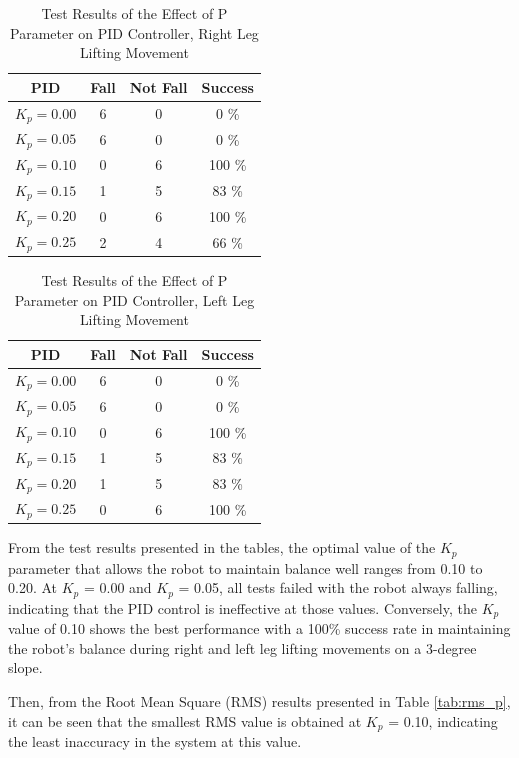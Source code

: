 \begin{enumerate}[label=\Alph*.]
        \begin{table}[h]
            \centering
            \caption{Test Results of the Effect of P Parameter on PID Controller, Right Leg Lifting Movement}
            \begin{tabular}{|c|c|c|c|}
                \hline
                \textbf{PID} & \textbf{Fall} & \textbf{Not Fall} & \textbf{Success} \\
                \hline
                $K_p = 0.00$ & 6 & 0 & 0   \% \\
                $K_p = 0.05$ & 6 & 0 & 0   \% \\
                $K_p = 0.10$ & 0 & 6 & 100 \% \\
                $K_p = 0.15$ & 1 & 5 & 83  \% \\
                $K_p = 0.20$ & 0 & 6 & 100 \% \\
                $K_p = 0.25$ & 2 & 4 & 66  \% \\            
                \hline
            \end{tabular}
            \label{tab:testing_p_right}
        \end{table}

        \begin{table}[h]
            \centering
            \caption{Test Results of the Effect of P Parameter on PID Controller, Left Leg Lifting Movement}
            \begin{tabular}{|c|c|c|c|}
                \hline
                \textbf{PID} & \textbf{Fall} & \textbf{Not Fall} & \textbf{Success} \\
                \hline
                $K_p = 0.00$ & 6 & 0 & 0   \% \\
                $K_p = 0.05$ & 6 & 0 & 0   \% \\
                $K_p = 0.10$ & 0 & 6 & 100 \% \\
                $K_p = 0.15$ & 1 & 5 & 83  \% \\
                $K_p = 0.20$ & 1 & 5 & 83  \% \\
                $K_p = 0.25$ & 0 & 6 & 100 \% \\            
                \hline
            \end{tabular}
            \label{tab:testing_p_left}
        \end{table}

        \hspace*{1em} From the test results presented in the tables, the optimal value of the \(K_p\) parameter that allows the robot to maintain balance well ranges from 0.10 to 0.20. At \(K_p\) = 0.00 and \(K_p\) = 0.05, all tests failed with the robot always falling, indicating that the PID control is ineffective at those values. Conversely, the \(K_p\) value of 0.10 shows the best performance with a 100\% success rate in maintaining the robot's balance during right and left leg lifting movements on a 3-degree slope.

        \hspace*{1em} Then, from the Root Mean Square (RMS) results presented in Table \ref{tab:rms_p}, it can be seen that the smallest RMS value is obtained at \(K_p\) = 0.10, indicating the least inaccuracy in the system at this value.

\end{enumerate}
